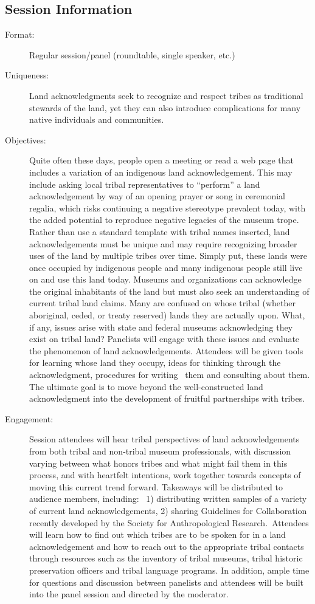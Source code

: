 \documentclass{report}
\begin{document}
              \subsection*{Session Information}
                \begin{description}
                  \item [Format:] Regular session/panel (roundtable, single speaker, etc.)
							    
							    \item [Uniqueness:]Land acknowledgments seek to recognize and respect tribes as traditional stewards of the land, yet they can also introduce complications for many native individuals and communities.
							    \item [Objectives:]Quite often these days, people open a meeting or read a web page that includes a variation of an indigenous land acknowledgement. This may include asking local tribal representatives to “perform” a land acknowledgement by way of an opening prayer or song in ceremonial regalia, which risks continuing a negative stereotype prevalent today, with the added potential to reproduce negative legacies of the museum trope. Rather than use a standard template with tribal names inserted, land acknowledgements must be unique and may require recognizing broader uses of the land by multiple tribes over time. Simply put, these lands were once occupied by indigenous people and many indigenous people still live on and use this land today. Museums and organizations can acknowledge the original inhabitants of the land but must also seek an understanding of current tribal land claims. Many are confused on whose tribal (whether aboriginal, ceded, or treaty reserved) lands they are actually upon. What, if any, issues arise with state and federal museums acknowledging they exist on tribal land? Panelists will engage with these issues and evaluate the phenomenon of land acknowledgements. Attendees will be given tools for learning whose land they occupy, ideas for thinking through the acknowledgment, procedures for writing  them and consulting about them. The ultimate goal is to move beyond the well-constructed land acknowledgment into the development of fruitful partnerships with tribes.
							    \item [Engagement:]Session attendees will hear tribal perspectives of land acknowledgements from both tribal and non-tribal museum professionals, with discussion varying between what honors tribes and what might fail them in this process, and with heartfelt intentions, work together towards concepts of moving this current trend forward. Takeaways will be distributed to audience members, including:  1) distributing written samples of a variety of current land acknowledgements, 2) sharing Guidelines for Collaboration recently developed by the Society for Anthropological Research. Attendees will learn how to find out which tribes are to be spoken for in a land acknowledgement and how to reach out to the appropriate tribal contacts through resources such as the inventory of tribal museums, tribal historic preservation officers and tribal language programs. In addition, ample time for questions and discussion between panelists and attendees will be built into the panel session and directed by the moderator.

\end{description}
\end{document}
